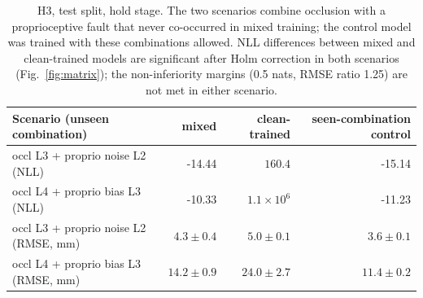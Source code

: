 \begin{table}[t]\centering\small\begin{tabular}{lrrr}\toprule
Scenario (unseen combination) & mixed & clean-trained & seen-combination control \\\midrule
occl L3 {+} proprio noise L2 (NLL) & -14.44 & $160.4$ & -15.14 \\
occl L4 {+} proprio bias L3 (NLL) & -10.33 & $1.1\!\times\!10^{6}$ & -11.23 \\
\midrule
occl L3 {+} proprio noise L2 (RMSE, mm) & $4.3{\pm}0.4$ & $5.0{\pm}0.1$ & $3.6{\pm}0.1$ \\
occl L4 {+} proprio bias L3 (RMSE, mm) & $14.2{\pm}0.9$ & $24.0{\pm}2.7$ & $11.4{\pm}0.2$ \\
\bottomrule\end{tabular}\caption{H3, test split, hold stage. The two scenarios combine occlusion with a proprioceptive fault that never co-occurred in mixed training; the control model was trained with these combinations allowed. NLL differences between mixed and clean-trained models are significant after Holm correction in both scenarios (Fig.~\ref{fig:matrix}); the non-inferiority margins (0.5 nats, RMSE ratio 1.25) are not met in either scenario.}\label{tab:h3}\end{table}
